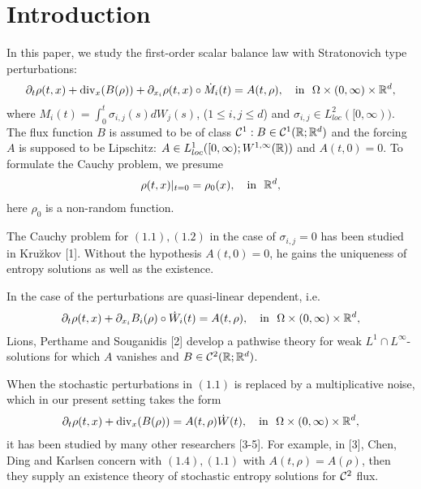 \documentclass[11pt]{article}
\begin{document}
\section{Introduction}\label{sec1}\setcounter{equation}{0}
\setcounter{equation}{0} In this paper, we study the first-order
scalar balance law with Stratonovich type perturbations:
\begin{eqnarray}\label{1.1}
\partial_t\rho(t,x)+\mbox{div}_x(B(\rho))
+\partial_{x_i}\rho(t,x)\circ\dot{M}_i(t)=A(t,\rho), \quad \mbox{in}
\ \ \Omega\times (0,\infty)\times {\mathbb R}^d,
\end{eqnarray}
where $M_i(t)=\int^t_0\sigma_{i,j}(s)dW_j(s)$, ($1\leq i,j\leq d$)
and $\sigma_{i,j}\in L^2_{loc}([0,\infty))$. The flux function $B$
is assumed to be of class ${\mathcal C}^1: B\in {\mathcal C}^1({\mathbb R};{\mathbb R}^d)$ and the
forcing $A$ is supposed to be Lipschitz: $A\in
L^1_{loc}([0,\infty);W^{1,\infty}({\mathbb R}))$ and $A(t,0)=0$. To
formulate the Cauchy problem, we presume
\begin{eqnarray}\label{1.2}
\rho(t,x)|_{t=0}=\rho_0(x), \quad  \mbox{in} \ \  {\mathbb R}^d,
\end{eqnarray}
here $\rho_0$ is a non-random function.
  \vskip1mm\par
The Cauchy problem for $(1.1), (1.2)$ in the case of
$\sigma_{i,j}=0$ has been studied in Kru\u{z}kov [1]. Without the
hypothesis $A(t,0)=0$, he gains the uniqueness of entropy solutions
as well as the existence.
  \vskip1mm\par
In the case of the perturbations are quasi-linear dependent, i.e.
\begin{eqnarray}\label{1.3}
\partial_t\rho(t,x)+\partial_{x_i}B_i(\rho)\circ\dot{W}_i(t)=A(t,\rho), \quad
 \mbox{in}
\ \  \Omega\times (0,\infty)\times {\mathbb R}^d,
\end{eqnarray}
Lions, Perthame and Souganidis [2] develop a pathwise theory for
weak $L^1\cap L^\infty$-solutions for which $A$ vanishes and $B\in
{\mathcal C}^2({\mathbb R};{\mathbb R}^d)$.
 \vskip1mm\par
When the stochastic perturbations in $(1.1)$ is replaced by a
multiplicative noise, which in our present setting takes the form
\begin{eqnarray}\label{1.4}
\partial_t\rho(t,x)+\mbox{div}_x(B(\rho))
=A(t,\rho)\dot{W}(t), \quad  \mbox{in} \ \
\Omega\times(0,\infty)\times {\mathbb R}^d,
\end{eqnarray}
it has been studied by many other researchers [3-5]. For example, in
[3], Chen, Ding and Karlsen concern with $(1.4), (1.1)$ with
$A(t,\rho)=A(\rho)$, then they supply an existence theory of
stochastic entropy solutions for ${\mathcal C}^2$ flux.
\end{document}
